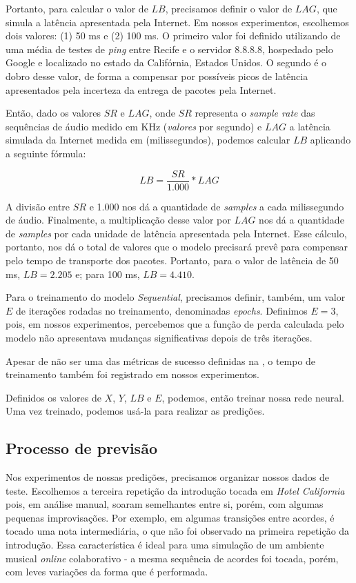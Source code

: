 Portanto, para calcular o valor de $LB$, precisamos definir o valor de $LAG$, que simula a latência apresentada pela Internet. Em nossos experimentos, escolhemos dois valores: (1) 50 ms e (2) 100 ms. O primeiro valor foi definido utilizando de uma média de testes de \textit{ping} entre Recife e o servidor 8.8.8.8, hospedado pelo Google e localizado no estado da Califórnia, Estados Unidos. O segundo é o dobro desse valor, de forma a compensar por possíveis picos de latência apresentados pela incerteza da entrega de pacotes pela Internet.

Então, dado os valores $SR$ e $LAG$, onde $SR$ representa o \textit{sample rate} das sequências de áudio medido em KHz (\textit{valores} por segundo) e $LAG$ a latência simulada da Internet medida em (milissegundos), podemos calcular $LB$ aplicando a seguinte fórmula:

\begin{equation}
    LB = \frac{SR}{1.000} * LAG
\end{equation}

A divisão entre $SR$ e 1.000 nos dá a quantidade de \textit{samples} a cada milissegundo de áudio. Finalmente, a multiplicação desse valor por $LAG$ nos dá a quantidade de \textit{samples} por cada unidade de latência apresentada pela Internet. Esse cálculo, portanto, nos dá o total de valores que o modelo precisará prevê para compensar pelo tempo de transporte dos pacotes. Portanto, para o valor de latência de 50 ms, $LB = 2.205$ e; para 100 ms, $LB = 4.410$.

Para o treinamento do modelo \textit{Sequential}, precisamos definir, também, um valor $E$ de iterações rodadas no treinamento, denominadas \textit{epochs}. Definimos $E = 3$, pois, em nossos experimentos, percebemos que a função de perda calculada pelo modelo não apresentava mudanças significativas depois de três iterações.

Apesar de não ser uma das métricas de sucesso definidas na , o tempo de treinamento também foi registrado em nossos experimentos.

Definidos os valores de $X$, $Y$, $LB$ e $E$, podemos, então treinar nossa rede neural. Uma vez treinado, podemos usá-la para realizar as predições.

\subsection{Processo de previsão}

Nos experimentos de nossas predições, precisamos organizar nossos dados de teste. Escolhemos a terceira repetição da introdução tocada em \textit{Hotel California} pois, em análise manual, soaram semelhantes entre si, porém, com algumas pequenas improvisações. Por exemplo, em algumas transições entre acordes, é tocado uma nota intermediária, o que não foi observado na primeira repetição da introdução. Essa característica é ideal para uma simulação de um ambiente musical \textit{online} colaborativo - a mesma sequência de acordes foi tocada, porém, com leves variações da forma que é performada.

